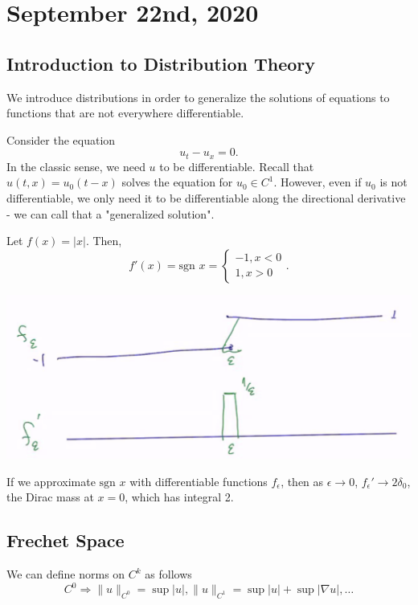 \documentclass[12pt]{scrartcl}
\begin{document}
\section{September 22nd, 2020}
\subsection{Introduction to Distribution Theory}
We introduce distributions in order to generalize the solutions of equations to functions that are not everywhere differentiable. 
\begin{example}
Consider the equation
$$u_t - u_x = 0.$$
In the classic sense, we need $u$ to be differentiable.  Recall that $u(t, x) = u_0(t-x)$ solves the equation for $u_0 \in C^1$.  However, even if $u_0$ is not differentiable, we only need it to be differentiable along the directional derivative - we can call that a "generalized solution".
\end{example}

\begin{example} Let $f(x) = |x|$.  Then, $$f'(x) = \text{sgn } x = \begin{cases} -1, x < 0\\ 1, x > 0
\end{cases}.$$
\begin{center}
\includegraphics[scale=0.5]{images/dist.png}
\end{center}
If we approximate $\text{sgn } x$ with differentiable functions $f_\epsilon$, then as $\epsilon \rightarrow 0$, $f_\epsilon' \rightarrow 2\delta_0$, the Dirac mass at $x = 0$, which has integral 2.
\end{example}

\subsection{Frechet Space}
We can define norms on $C^k$ as follows
$$C^0 \Rightarrow \|u\|_{C^0} = \sup |u|, \|u\|_{C^1} = \sup|u| + \sup|\nabla u|, \dots$$
\end{document}
